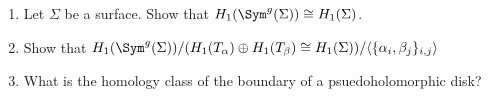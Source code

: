 

    \begin{enumerate}
            \item    Let $\Sigma$ be a surface. Show that $H_1(\Sym^g(\Sigma))\cong H_1(\Sigma)$.
            \item    Show that $H_1(\Sym^g(\Sigma))/(H_1(T_\alpha)\oplus H_1(T_\beta)\cong H_1(\Sigma))/\langle\{\alpha_i,\beta_j\}_{i,j}\rangle$
             \item   What is the homology class of the boundary of a psuedoholomorphic disk?
    \end{enumerate}

